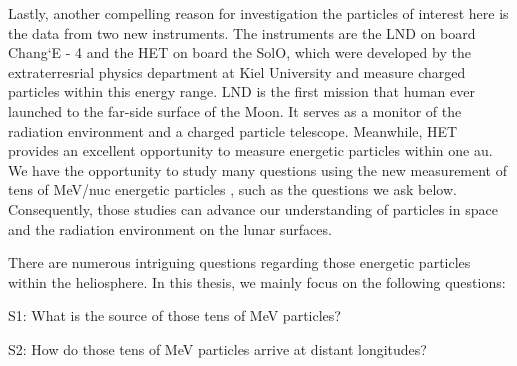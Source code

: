 Lastly, another compelling reason for investigation the particles of interest here is the data from two new instruments. The instruments are the \ac{LND} on board Chang`E - 4 and the \ac{HET} on board the \ac{SolO}, which were developed by the extraterresrial physics department at Kiel University and measure charged particles within this energy range. \ac{LND} is the first mission that human ever launched to the far-side surface of the Moon. It serves as a monitor of the radiation environment and a charged particle telescope. Meanwhile, \ac{HET} provides an excellent opportunity to measure energetic particles within one au. We have the opportunity to study many questions using the new measurement of tens of MeV/nuc energetic particles \citep{Wimmer2020SSRv,RodriguezPacheco-2019-EPD}, such as the questions we ask below.
Consequently, those studies can advance our understanding of particles in space and the radiation environment on the lunar surfaces.



There are numerous intriguing questions regarding those energetic particles within the heliosphere. In this thesis, we mainly focus on the following questions:


\begin{tcolorbox}[colback=blue!5!white,colframe=blue!75!black,title=Scientific questions - \acp{SEP}]
	S1: What is the source of those tens of MeV particles?  \\
	\hfill

	S2: How do those tens of MeV particles arrive at distant longitudes?
	
\end{tcolorbox}
	

